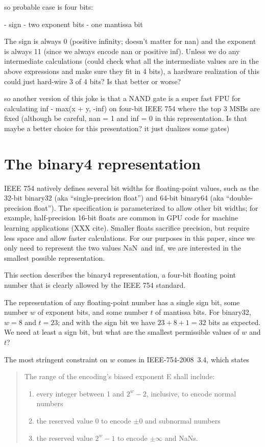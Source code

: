 \documentclass[twocolumn]{article}
\newcommand\nan{\textsf{NaN}}
\renewcommand\inf{\textsf{inf}}
\newcommand\plusminus{\pm}
\begin{document}
{so probable case is four bits:

 - sign
 - two exponent bits
 - one mantissa bit

The sign is always 0 (positive infinity; doesn't matter for nan)
and the exponent is always 11 (since we always encode nan or
positive inf). Unless we do any intermediate calculations
(could check what all the intermediate values are in the above
expressions and make sure they fit in 4 bits), a hardware
realization of this could just hard-wire 3 of 4 bits? Is that
better or worse?

so another version of this joke is that a NAND gate is a super
fast FPU for calculating inf - max(x + y, -inf) on four-bit
IEEE 754 where the top 3 MSBs are fixed (although be careful,
nan = 1 and inf = 0 in this representation. Is that maybe a
better choice for this presentation? it just dualizes some
gates)

}

\section{The binary4 representation}

IEEE 754 natively defines several bit widths for floating-point
values, such as the 32-bit binary32 (aka ``single-precision float'')
and 64-bit binary64 (aka ``double-precision float''). The
specification is parameterized to allow other bit widths; for example,
half-precision 16-bit floats are common in GPU code for machine
learning applications (XXX cite). Smaller floats sacrifice precision,
but require less space and allow faster calculations. For our purposes
in this paper, since we only need to represent the two values \nan\ and
\inf, we are interested in the smallest possible representation. 


This section describes the binary4 representation, a four-bit floating
point number that is clearly allowed by the IEEE 754 standard.

The representation of any floating-point number has a single sign bit,
some number $w$ of exponent bits, and some number $t$ of mantissa
bits. For binary32, $w = 8$ and $t = 23$; and with the sign bit we
have $23 + 8 + 1 = 32$ bits as expected. We need at least a sign bit,
but what are the smallest permissible values of $w$ and $t$?

The most stringent constraint on $w$ comes in IEEE-754-2008~3.4, which
states
\begin{quote}
  The range of the encoding's biased exponent E shall include:
  \begin{enumerate}[label=---]
    \item every integer between 1 and $2^w - 2$, inclusive, to encode
      normal numbers
    \item the reserved value 0 to encode $\plusminus 0$ and subnormal
      numbers
    \item the reserved value $2^w - 1$ to encode $\plusminus \infty$
      and NaNs.
  \end{enumerate}
\end{quote}
\end{document}
